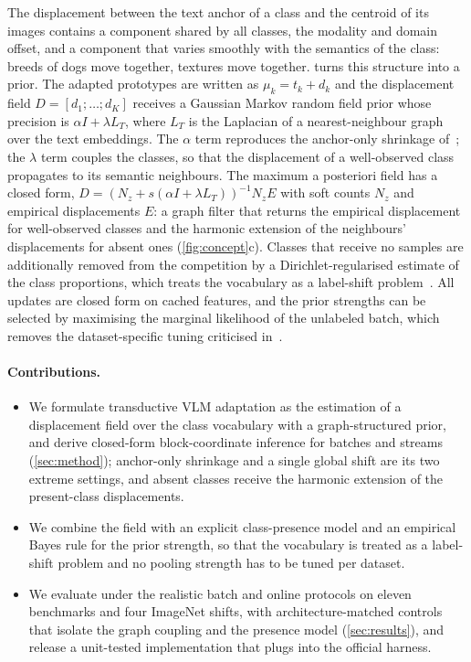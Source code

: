 The displacement between the text anchor of a class and the centroid of its images contains a component shared by all classes, the modality and domain offset, and a component that varies smoothly with the semantics of the class: breeds of dogs move together, textures move together. \method turns this structure into a prior. The adapted prototypes are written as $\mu_k = t_k + d_k$ and the displacement field $D = [d_1;\dots;d_K]$ receives a Gaussian Markov random field prior whose precision is $\alpha I + \lambda L_T$, where $L_T$ is the Laplacian of a nearest-neighbour graph over the text embeddings. The $\alpha$ term reproduces the anchor-only shrinkage of~\cite{zanella2025stata,huang2026moon}; the $\lambda$ term couples the classes, so that the displacement of a well-observed class propagates to its semantic neighbours. The maximum a posteriori field has a closed form, $D = (N_z + s(\alpha I + \lambda L_T))^{-1} N_z E$ with soft counts $N_z$ and empirical displacements $E$: a graph filter that returns the empirical displacement for well-observed classes and the harmonic extension of the neighbours' displacements for absent ones (\cref{fig:concept}c). Classes that receive no samples are additionally removed from the competition by a Dirichlet-regularised estimate of the class proportions, which treats the vocabulary as a label-shift problem~\cite{saerens2002adjusting,garg2020unified}. All updates are closed form on cached features, and the prior strengths can be selected by maximising the marginal likelihood of the unlabeled batch, which removes the dataset-specific tuning criticised in~\cite{sheng2025illusion}.

\paragraph{Contributions.}
\begin{itemize}
  \item We formulate transductive VLM adaptation as the estimation of a displacement field over the class vocabulary with a graph-structured prior, and derive closed-form block-coordinate inference for batches and streams (\cref{sec:method}); anchor-only shrinkage and a single global shift are its two extreme settings, and absent classes receive the harmonic extension of the present-class displacements.
  \item We combine the field with an explicit class-presence model and an empirical Bayes rule for the prior strength, so that the vocabulary is treated as a label-shift problem and no pooling strength has to be tuned per dataset.
  \item We evaluate \method under the realistic batch and online protocols on eleven benchmarks and four ImageNet shifts, with architecture-matched controls that isolate the graph coupling and the presence model (\cref{sec:results}), and release a unit-tested implementation that plugs into the official harness.
\end{itemize}

